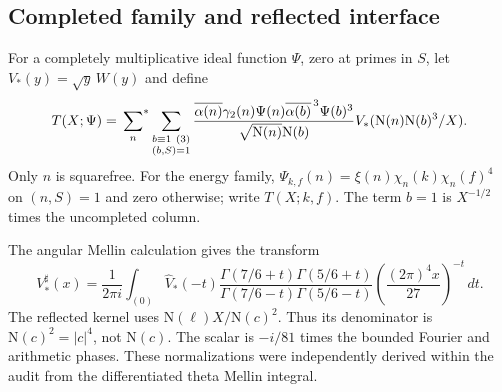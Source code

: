 \documentclass[11pt]{article}
\numberwithin{equation}{section}
\theoremstyle{definition}
\theoremstyle{remark}
\newcommand{\N}{\mathrm N}
\newcommand{\sfstar}{\sideset{}{^*}\sum}
\newcommand{\dd}{\,d}
\begin{document}
\subsection{Completed family and reflected interface}

For a completely multiplicative ideal function \(\Psi\), zero at
primes in \(S\), let \(V_*(y)=\sqrt y\,W(y)\) and define
\begin{equation}\label{eq:T-audit}
 T(X;\Psi)=\sfstar_n\sum_{\substack{b\equiv1\ (3)\\(b,S)=1}}
 \frac{\overline{\alpha(n)}\gamma_2(n)\Psi(n)
        \overline{\alpha(b)}^{\,3}\Psi(b)^3}
      {\sqrt{\N(n)}\N(b)}
 V_*(\N(n)\N(b)^3/X).
\end{equation}
Only \(n\) is squarefree. For the energy family,
\(\Psi_{k,f}(n)=\xi(n)\chi_n(k)\chi_n(f)^4\) on \((n,S)=1\)
and zero otherwise; write \(T(X;k,f)\). The term \(b=1\)
is \(X^{-1/2}\) times the uncompleted column.

The angular Mellin calculation gives the transform
\begin{equation}\label{eq:sharp}
 V_*^\sharp(x)=\frac1{2\pi i}\int_{(0)}
 \widehat V_*(-t)
 \frac{\Gamma(7/6+t)\Gamma(5/6+t)}
      {\Gamma(7/6-t)\Gamma(5/6-t)}
 \left(\frac{(2\pi)^4x}{27}\right)^{-t}\dd t.
\end{equation}
The reflected kernel uses \(\N(\ell)X/\N(c)^2\).
Thus its denominator is \(\N(c)^2=|c|^4\), not \(\N(c)\).
The scalar is \(-i/81\) times the bounded Fourier and arithmetic
phases. These normalizations were independently derived within
the audit from the differentiated theta Mellin integral.
\end{document}
